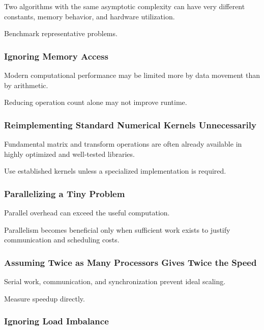 Two algorithms with the same asymptotic complexity can have very different
constants, memory behavior, and hardware utilization.

Benchmark representative problems.

\subsubsection{Ignoring Memory Access}

Modern computational performance may be limited more by data movement than
by arithmetic.

Reducing operation count alone may not improve runtime.

\subsubsection{Reimplementing Standard Numerical Kernels Unnecessarily}

Fundamental matrix and transform operations are often already available in
highly optimized and well-tested libraries.

Use established kernels unless a specialized implementation is required.

\subsubsection{Parallelizing a Tiny Problem}

Parallel overhead can exceed the useful computation.

Parallelism becomes beneficial only when sufficient work exists to justify
communication and scheduling costs.

\subsubsection{Assuming Twice as Many Processors Gives Twice the Speed}

Serial work, communication, and synchronization prevent ideal scaling.

Measure speedup directly.

\subsubsection{Ignoring Load Imbalance}

